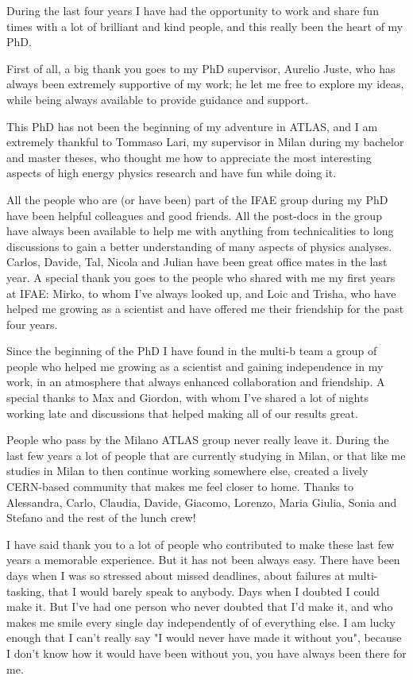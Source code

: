 During the last four years I have had the opportunity to work and share fun times with a lot 
of brilliant and kind people, and this really been the heart of my PhD. 

First of all, a big thank you goes to my PhD supervisor, Aurelio Juste, who has always been 
extremely supportive of my work; 
he let me free to explore my ideas, while being always available to provide guidance and support. 


This PhD has not been the beginning of my adventure in ATLAS, and I am extremely thankful to 
Tommaso Lari, my supervisor in Milan during my bachelor and master theses,  
who thought me how to appreciate the most interesting aspects of high energy physics research 
and have fun while doing it.  

All the people who are (or have been) part of the IFAE group during my PhD have been helpful colleagues and 
good friends. All the post-docs in the group have always been available to help me with 
anything from technicalities to long discussions to gain a better understanding of many aspects of physics analyses. 
Carlos, Davide, Tal, Nicola and Julian have been great office mates in the last year. 
A special thank you goes to the people who shared with me my first years at IFAE: Mirko, to whom 
I've always looked up, and Loic and Trisha, who have helped me growing as a scientist and have offered me 
their friendship for the past four years.  

Since the beginning of the PhD I have found in the multi-b team a group of people who helped me 
growing as a scientist and gaining independence in my work, 
in an atmosphere that always enhanced collaboration and friendship.  
A special thanks to Max and Giordon, with whom I've shared a lot of nights working late and 
discussions that helped making all of our results great. 

People who pass by the Milano ATLAS group never really leave it. 
During the last few years a lot of people that are currently studying in Milan, or that like me 
studies in Milan to then continue working somewhere else, created a lively CERN-based community that 
makes me feel closer to home. 
Thanks to Alessandra, Carlo, Claudia, Davide, Giacomo, Lorenzo, Maria Giulia, Sonia and Stefano and the rest of the 
lunch crew! 

I have said thank you to a lot of people who contributed to make these last few years a memorable experience. 
But it has not been always easy. There have been days when I was so stressed about missed deadlines, 
about failures at multi-tasking, that 
I would barely speak to anybody. 
Days when I doubted I could make it. 
But I've had one person who never doubted that I'd make it, and who makes me smile every single day independently 
of of everything else. 
I am lucky enough that I can't really say "I would never have made it without you", 
because I don't know how it would have been without you, you have always been there for me. 
